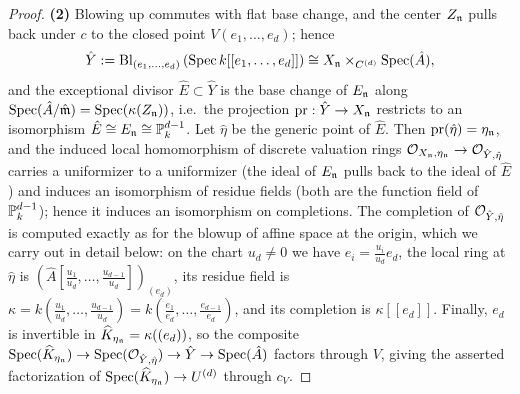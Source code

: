 \begin{proof}
    \textbf{(2)} Blowing up commutes with flat base change, and the center $Z_{\mathfrak{n}}$ pulls back under $c$ to the closed
    point $V(e_1, \dots, e_d)$; hence
    $$\hat{Y} := \operatorname{Bl}_{(e_1, \dots, e_d)}\left(\operatorname{Spec} k[[e_1, \dots, e_d]]\right) \cong X_{\mathfrak{n}} \times_{C^{(d)}} \operatorname{Spec}(\hat{A}),$$
    and the exceptional divisor $\hat{E} \subset \hat{Y}$ is the base change of $E_{\mathfrak{n}}$ along
    $\operatorname{Spec}(\hat{A}/\hat{\mathfrak{m}}) = \operatorname{Spec}(\kappa(Z_{\mathfrak{n}}))$, i.e.\ the projection $\mathrm{pr}: \hat{Y} \to X_{\mathfrak{n}}$
    restricts to an isomorphism $\hat{E} \cong E_{\mathfrak{n}} \cong \mathbb{P}_k^{d-1}$.
    Let $\hat{\eta}$ be the generic point of $\hat{E}$. Then $\mathrm{pr}(\hat\eta) = \eta_{\mathfrak{n}}$, and the induced local
    homomorphism of discrete valuation rings $\mathcal{O}_{X_{\mathfrak{n}}, \eta_{\mathfrak{n}}} \to \mathcal{O}_{\hat{Y}, \hat{\eta}}$ carries a uniformizer
    to a uniformizer (the ideal of $E_{\mathfrak{n}}$ pulls back to the ideal of $\hat{E}$) and induces an isomorphism of residue
    fields (both are the function field of $\mathbb{P}_k^{d-1}$); hence it induces an isomorphism on completions.
    The completion of $\mathcal{O}_{\hat{Y}, \hat{\eta}}$ is computed exactly as for the blowup of affine space at the origin, which
    we carry out in detail below: on the chart $u_d \neq 0$ we have $e_i = \frac{u_i}{u_d} e_d$, the local ring at
    $\hat\eta$ is $\left(\hat{A}[\frac{u_1}{u_d}, \dots, \frac{u_{d-1}}{u_d}]\right)_{(e_d)}$, its residue field is
    $\kappa = k(\frac{u_1}{u_d}, \dots, \frac{u_{d-1}}{u_d}) = k(\frac{e_1}{e_d}, \dots, \frac{e_{d-1}}{e_d})$, and its
    completion is $\kappa[[e_d]]$.
    Finally, $e_d$ is invertible in $\widehat{K}_{\eta_{\mathfrak{n}}} = \kappa((e_d))$, so the composite
    $\operatorname{Spec}(\widehat{K}_{\eta_{\mathfrak{n}}}) \to \operatorname{Spec}(\mathcal{O}_{\hat{Y}, \hat\eta}) \to \hat{Y} \to \operatorname{Spec}(\hat{A})$ factors through $V$,
    giving the asserted factorization of $\operatorname{Spec}(\widehat{K}_{\eta_{\mathfrak{n}}}) \to U^{(d)}$ through $c_V$.


\end{proof}
